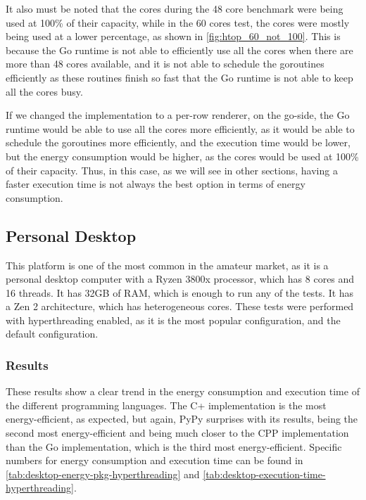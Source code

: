It also must be noted that the cores during the 48 core benchmark were being used at 100\% of their capacity, while in the 60 cores test, the cores were mostly being used at a lower percentage, as shown in \autoref{fig:htop_60_not_100}. This is because the Go runtime is not able to efficiently use all the cores when there are more than 48 cores available, and it is not able to schedule the goroutines efficiently as these routines finish so fast that the Go runtime is not able to keep all the cores busy.

If we changed the implementation to a per-row renderer, on the go-side, the Go runtime would be able to use all the cores more efficiently, as it would be able to schedule the goroutines more efficiently, and the execution time would be lower, but the energy consumption would be higher, as the cores would be used at 100\% of their capacity. Thus, in this case, as we will see in other sections, having a faster execution time is not always the best option in terms of energy consumption.





\subsection{Personal Desktop}
This platform is one of the most common in the amateur market, as it is a personal desktop computer with a Ryzen 3800x processor, which has 8 cores and 16 threads. It has 32GB of RAM, which is enough to run any of the tests. It has a Zen 2 architecture, which has heterogeneous cores. These tests were performed with hyperthreading enabled, as it is the most popular configuration, and the default configuration. 


\subsubsection{Results}





These results show a clear trend in the energy consumption and execution time of the different programming languages. The C\++ implementation is the most energy-efficient, as expected, but again, PyPy surprises with its results, being the second most energy-efficient and being much closer to the \gls{CPP} implementation than the Go implementation, which is the third most energy-efficient. Specific numbers for energy consumption and execution time can be found in \autoref{tab:desktop-energy-pkg-hyperthreading} and \autoref{tab:desktop-execution-time-hyperthreading}.

